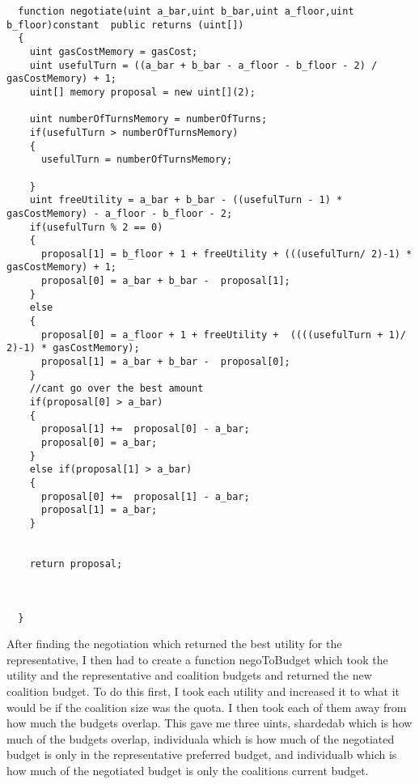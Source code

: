 \begin{lstlisting}
  function negotiate(uint a_bar,uint b_bar,uint a_floor,uint b_floor)constant  public returns (uint[])
  {
    uint gasCostMemory = gasCost;
    uint usefulTurn = ((a_bar + b_bar - a_floor - b_floor - 2) / gasCostMemory) + 1;
    uint[] memory proposal = new uint[](2);

    uint numberOfTurnsMemory = numberOfTurns;
    if(usefulTurn > numberOfTurnsMemory)
    {
      usefulTurn = numberOfTurnsMemory;

    }
    uint freeUtility = a_bar + b_bar - ((usefulTurn - 1) * gasCostMemory) - a_floor - b_floor - 2;
    if(usefulTurn % 2 == 0)
    {
      proposal[1] = b_floor + 1 + freeUtility + (((usefulTurn/ 2)-1) * gasCostMemory) + 1;
      proposal[0] = a_bar + b_bar -  proposal[1];
    }
    else
    {
      proposal[0] = a_floor + 1 + freeUtility +  ((((usefulTurn + 1)/ 2)-1) * gasCostMemory);
      proposal[1] = a_bar + b_bar -  proposal[0];
    }
    //cant go over the best amount
    if(proposal[0] > a_bar)
    {
      proposal[1] +=  proposal[0] - a_bar;
      proposal[0] = a_bar;
    }
    else if(proposal[1] > a_bar)
    {
      proposal[0] +=  proposal[1] - a_bar;
      proposal[1] = a_bar;
    }


    return proposal;



  }
\end{lstlisting}
After finding the negotiation which returned the best utility for the representative, I then had to create a function negoToBudget which took the utility and the representative and coalition budgets and returned the new coalition budget. To do this first, I took each utility and increased it to what it would be if the coalition size was the quota. I then took each of them away from how much the budgets overlap. This gave me three uints,  shardedab which is how much of the budgets overlap, individuala which is how much of the negotiated budget is only in the representative preferred budget, and individualb which is how much of the negotiated budget is only the coalitions current budget. \\

